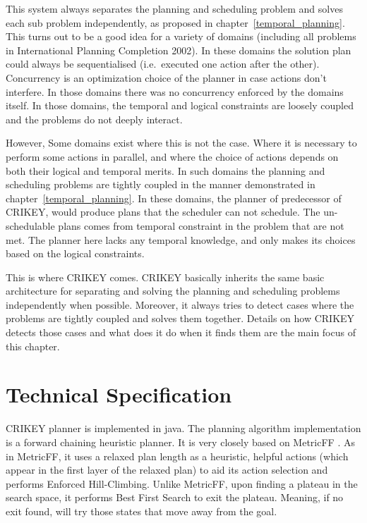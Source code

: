 \documentclass
[a4paper
,english
,parskip=half
,bibliography=totoc
]{scrreprt}
\begin{document}
    This system always separates the planning and scheduling problem and solves each sub problem independently, as proposed in chapter~\ref{temporal_planning}. This turns out to be a good idea for a variety of domains (including all problems in International Planning Completion 2002). In these domains the solution plan could always be sequentialised (i.e.\ executed one action after the other). Concurrency is an optimization choice of the planner in case actions don't interfere. In those domains there was no concurrency enforced by the domains itself. In those domains, the temporal and logical constraints are loosely coupled and the problems do not deeply interact. 

    However, Some domains exist where this is not the case. Where it is necessary to perform some actions in parallel, and where the choice of actions depends on both their logical and temporal merits. In such domains the planning and scheduling problems are tightly coupled in the manner demonstrated in chapter~\ref{temporal_planning}. In these domains, the planner of predecessor of CRIKEY, would produce plans that the scheduler can not schedule. The un-schedulable plans comes from temporal constraint in the problem that are not met. The planner here lacks any temporal knowledge, and only makes its choices based on the logical constraints.

    This is where CRIKEY comes. CRIKEY basically inherits the same basic architecture for separating and solving the planning and scheduling problems independently when possible. Moreover, it always tries to detect cases where the problems are tightly coupled and solves them together. Details on how CRIKEY detects those cases and what does it do when it finds them are the main focus of this chapter.

    \section{Technical Specification} \label{tech}
    CRIKEY planner is implemented in java.
    The planning algorithm implementation is a forward chaining heuristic planner.
    It is very closely based on MetricFF \citep{hoffmann:ecai-02}.
    As in MetricFF, it uses a relaxed plan length as a heuristic, helpful actions (which appear in the first layer of the relaxed plan) to aid its action selection and performs Enforced Hill-Climbing.
    Unlike MetricFF, upon finding a plateau in the search space, it performs Best First Search to exit the plateau. Meaning, if no exit found, will try those states that move away from the goal.
\end{document}
